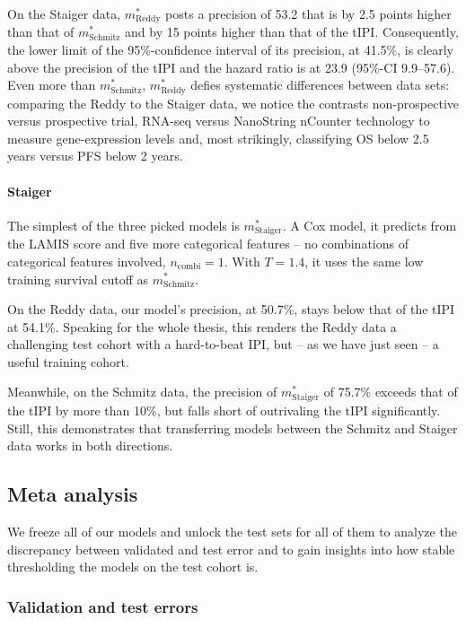 On the Staiger data, $m^*_\text{Reddy}$ posts a precision of \num{53.2} that is by \num{2.5} 
points higher than that of $m^*_\text{Schmitz}$ and by \num{15} points higher than that of the tIPI. 
Consequently, the lower limit of the \num{95}\%-confidence interval of its precision, at 
\num{41.5}\%, is 
clearly above the precision of the tIPI and the hazard ratio is at \num{23.9}
(\num{95}\%-CI \num{9.9}--\num{57.6}). Even more than $m^*_\text{Schmitz}$, $m^*_\text{Reddy}$ 
defies systematic differences between data sets: comparing the Reddy to the Staiger data, we 
notice the contrasts non-prospective versus prospective trial, 
RNA-seq versus NanoString nCounter technology to measure gene-expression levels and, most strikingly, 
classifying OS below \num{2.5} years versus PFS below \num{2} years.

\paragraph{Staiger}
The simplest of the three picked models is $m^*_\text{Staiger}$. A Cox model, it predicts from 
the LAMIS score and five more categorical features -- no combinations of categorical features involved, 
$n_\text{combi} = 1$. With $T = \num{1.4}$, it uses the same low training survival cutoff as 
$m^*_\text{Schmitz}$.

On the Reddy data, our model's precision, at \num{50.7}\%, stays below that of the tIPI at \num{54.1}\%. 
Speaking for the whole thesis, this renders the Reddy data a challenging test cohort with a 
hard-to-beat IPI, but -- as we have just seen -- a useful training cohort.

Meanwhile, on the Schmitz data, the precision of $m^*_\text{Staiger}$ of \num{75.7}\% exceeds that 
of the tIPI by more than \num{10}\%, but falls short of outrivaling the tIPI significantly. Still, 
this demonstrates that transferring models between the Schmitz and Staiger data works in both 
directions.

\subsection{Meta analysis}\label{subsec:results-inter-meta}

We freeze all of our models and unlock the test sets for all of them to analyze the discrepancy 
between validated and test error and to gain insights into how stable thresholding the models on the 
test cohort is.

\subsubsection{Validation and test errors}

